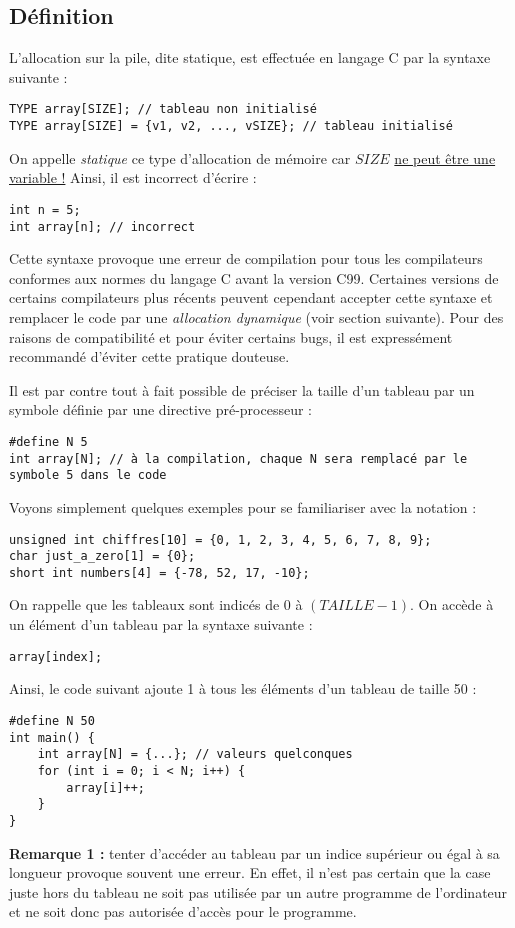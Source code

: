 \documentclass[../../../main.tex]{subfiles}
\begin{document}
\subsection{Définition}
L'allocation sur la pile, dite statique, est effectuée en langage C par la syntaxe suivante :
\begin{verbatim}
TYPE array[SIZE]; // tableau non initialisé
TYPE array[SIZE] = {v1, v2, ..., vSIZE}; // tableau initialisé
\end{verbatim}
On appelle \textit{statique} ce type d'allocation de mémoire car $SIZE$ \underline{ne peut être une variable !} Ainsi, il est incorrect d'écrire :
\begin{verbatim}
int n = 5;
int array[n]; // incorrect
\end{verbatim}
Cette syntaxe provoque une erreur de compilation pour tous les compilateurs conformes aux normes du langage C avant la version C99. Certaines versions de certains compilateurs plus récents peuvent cependant accepter cette syntaxe et remplacer le code par une \textit{allocation dynamique} (voir section suivante). Pour des raisons de compatibilité et pour éviter certains bugs, il est expressément recommandé d'éviter cette pratique douteuse.
 
Il est par contre tout à fait possible de préciser la taille d'un tableau par un symbole définie par une directive pré-processeur :
\begin{verbatim}
#define N 5
int array[N]; // à la compilation, chaque N sera remplacé par le symbole 5 dans le code
\end{verbatim}
Voyons simplement quelques exemples pour se familiariser avec la notation :
\begin{verbatim}
unsigned int chiffres[10] = {0, 1, 2, 3, 4, 5, 6, 7, 8, 9};
char just_a_zero[1] = {0};
short int numbers[4] = {-78, 52, 17, -10};
\end{verbatim}
On rappelle que les tableaux sont indicés de 0 à $(TAILLE - 1)$. On accède à un élément d'un tableau par la syntaxe suivante :
\begin{verbatim}
array[index];
\end{verbatim}
Ainsi, le code suivant ajoute 1 à tous les éléments d'un tableau de taille 50 :
\begin{verbatim}
#define N 50
int main() {
	int array[N] = {...}; // valeurs quelconques
	for (int i = 0; i < N; i++) {
		array[i]++;
	}
}
\end{verbatim}
\textbf{Remarque 1 :} tenter d'accéder au tableau par un indice supérieur ou égal à sa longueur provoque souvent une erreur. En effet, il n'est pas certain que la case juste hors du tableau ne soit pas utilisée par un autre programme de l'ordinateur et ne soit donc pas autorisée d'accès pour le programme.
 
\end{document}
